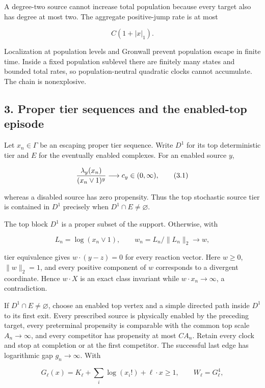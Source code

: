 A degree-two source cannot increase total population because every
target also has degree at most two. The aggregate positive-jump rate is
at most

\[
                         C(1+|x|_1).                         \tag{2.1}
\]

Localization at population levels and Gronwall prevent population escape
in finite time. Inside a fixed population sublevel there are finitely
many states and bounded total rates, so population-neutral quadratic
clocks cannot accumulate. The chain is nonexplosive.

\subsection{3. Proper tier sequences and the enabled-top
episode}

Let \(x_n\in\Gamma\) be an escaping proper tier sequence. Write \(D^1\)
for its top deterministic tier and \(E\) for the eventually enabled
complexes. For an enabled source \(y\),

\[
 {\lambda_y(x_n)\over(x_n\vee1)^y}\longrightarrow c_y\in(0,\infty),
                                                               \tag{3.1}
\]

whereas a disabled source has zero propensity. Thus the top stochastic
source tier is contained in \(D^1\) precisely when
\(D^1\cap E\ne\varnothing\).

The top block \(D^1\) is a proper subset of the support. Otherwise, with

\[
       L_n=\log(x_n\vee1),\qquad
       w_n=L_n/\lVert L_n\rVert_2\longrightarrow w,
\]

tier equivalence gives \(w\cdot(y-z)=0\) for every reaction vector. Here
\(w\ge0\), \(\lVert w\rVert_2=1\), and every positive component of \(w\)
corresponds to a divergent coordinate. Hence \(w\cdot X\) is an exact
class invariant while \(w\cdot x_n\to\infty\), a contradiction.

If \(D^1\cap E\ne\varnothing\), choose an enabled top vertex and a
simple directed path inside \(D^1\) to its first exit. Every prescribed
source is physically enabled by the preceding target, every preterminal
propensity is comparable with the common top scale \(A_n\to\infty\), and
every competitor has propensity at most \(CA_n\). Retain every clock and
stop at completion or at the first competitor. The successful last edge
has logarithmic gap \(g_n\to\infty\). With

\[
 G_\ell(x)=K_\ell+\sum_i\log(x_i!)+\ell\cdot x\ge1,
 \qquad W_\ell=G_\ell^4,                                  \tag{3.2}
\]

